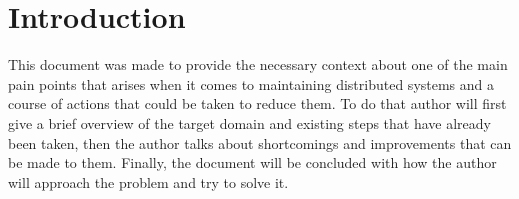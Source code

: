 \chapter{Introduction}





This document was made to provide the necessary context about one of the main pain points that arises when it comes to maintaining distributed systems and a course of actions that could be taken to reduce them. To do that author will first give a brief overview of the target domain and existing steps that have already been taken, then the author talks about shortcomings and improvements that can be made to them. Finally, the document will be concluded with how the author will approach the problem and try to solve it.